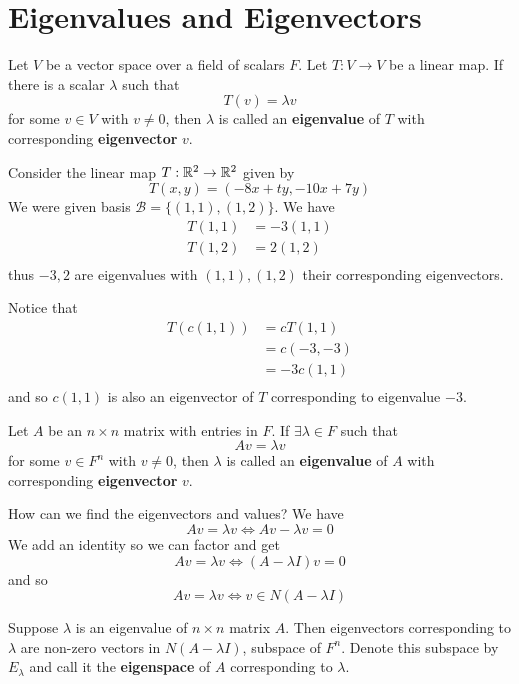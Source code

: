 \documentclass{article}
\begin{document}
\section{Eigenvalues and Eigenvectors}
\begin{definition}
  Let $V$ be a vector space over a field of scalars $F$. Let $T: V \to V$ be a linear map. If there is a scalar $\lambda$ such that \[
    T(v) = \lambda v
  \] for some $v \in V$ with $v \neq 0$, then $\lambda$ is called an \textbf{eigenvalue} of $T$ with corresponding \textbf{eigenvector} $v$.
\end{definition}
\begin{example}
  Consider the linear map $T: \mathbb{R}^2 \to \mathbb{R}^2$ given by \[
    T(x, y) = (-8x + ty, -10x + 7y)
  \] We were given basis $\mathcal{B} = \{(1, 1), (1, 2)\}$. We have
  \begin{align*}
    T(1, 1) &= -3(1, 1)\\
    T(1, 2) &= 2(1, 2)\\
  \end{align*} thus $-3, 2$ are eigenvalues with $(1, 1), (1, 2)$ their corresponding eigenvectors.

  Notice that
  \begin{align*}
    T(c(1, 1)) &= cT(1, 1)\\
    &= c(-3, -3)\\
    &= -3c(1, 1)\\
  \end{align*} and so $c(1, 1)$ is also an eigenvector of $T$ corresponding to eigenvalue $-3$.
\end{example}
\begin{definition}
  Let $A$ be an $n \times n$ matrix with entries in $F$. If $\exists \lambda \in F$ such that \[
    Av = \lambda v
  \] for some $v \in F^n$ with $v \neq 0$, then $\lambda$ is called an \textbf{eigenvalue} of $A$ with corresponding \textbf{eigenvector} $v$.
\end{definition}
\begin{remark}
  How can we find the eigenvectors and values? We have \[
    Av = \lambda v \iff Av - \lambda v = 0
  \]
  We add an identity so we can factor and get \[
    Av = \lambda v \iff (A - \lambda I)v = 0
  \] and so \[
    Av = \lambda v \iff v \in N(A - \lambda I)
  \]
\end{remark}
\begin{theorem}
  Suppose $\lambda$ is an eigenvalue of $n \times n$ matrix $A$. Then eigenvectors corresponding to $\lambda$ are non-zero vectors in $N(A - \lambda I)$, subspace of $F^n$. Denote this subspace by $E_\lambda$ and call it the \textbf{eigenspace} of $A$ corresponding to $\lambda$.
\end{theorem}
\end{document}
